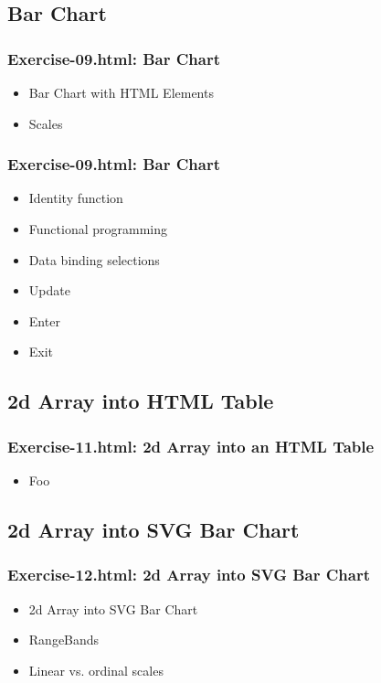 \documentclass{beamer}
\begin{document}
\subsection{Bar Chart}


\begin{frame}
    \frametitle{Exercise-09.html: Bar Chart}
    \begin{itemize}
    \item Bar Chart with HTML Elements
    \item Scales
    \end{itemize}
\end{frame}


\begin{frame}
    \frametitle{Exercise-09.html: Bar Chart}
    \begin{itemize}
    \item Identity function
    \item Functional programming
    \item Data binding selections
    \item Update
    \item Enter
    \item Exit
    \end{itemize}
\end{frame}


\subsection{2d Array into HTML Table}

\begin{frame}
    \frametitle{Exercise-11.html: 2d Array into an HTML Table}
    \begin{itemize}
    \item Foo
    \end{itemize}
\end{frame}



\subsection{2d Array into SVG Bar Chart}

\begin{frame}
    \frametitle{Exercise-12.html: 2d Array into SVG Bar Chart}
    \begin{itemize}
    \item 2d Array into SVG Bar Chart
    \item RangeBands
    \item Linear vs. ordinal scales
    \end{itemize}
\end{frame}
\end{document}
